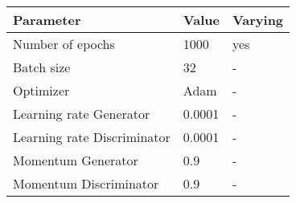 \begin{table}[ht!]
\scriptsize
\begin{center}
\begin{tabular}{ M{4cm}  M{1.5cm} M{1.5cm}}
\toprule
\textbf{Parameter} & \textbf{Value} & \textbf{Varying} \\
\midrule
Number of epochs & 1000 & yes\\
Batch size & 32 & -\\
\midrule
Optimizer & Adam & -\\
Learning rate Generator & 0.0001 & -\\
Learning rate Discriminator & 0.0001 & -\\
Momentum Generator & 0.9 & -\\
Momentum Discriminator & 0.9 & -\\
\bottomrule
\end{tabular}
\end{center}
\end{table}